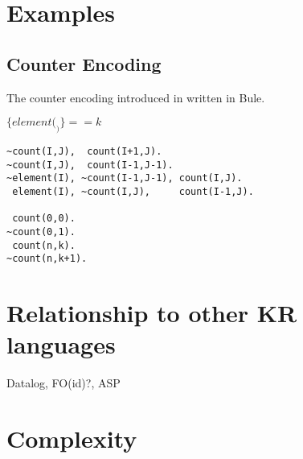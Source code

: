 \documentclass{article}
\begin{document}
\section{Examples}

\subsection{Counter Encoding}

The counter encoding introduced in \cite{sinz2005} written in Bule. 

$\{ element(_) \} == k$

\begin{lstlisting}
~count(I,J),  count(I+1,J).
~count(I,J),  count(I-1,J-1).
~element(I), ~count(I-1,J-1), count(I,J).
 element(I), ~count(I,J),     count(I-1,J).

 count(0,0).
~count(0,1).
 count(n,k).
~count(n,k+1).
\end{lstlisting}

\section{Relationship to other KR languages}

Datalog, FO(id)?, ASP

\section{Complexity}



\end{document}
